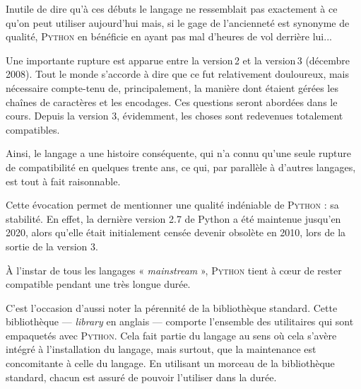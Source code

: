 Inutile de dire qu'à ces débuts le langage ne ressemblait pas exactement à ce qu'on peut utiliser aujourd'hui mais, si le gage de l'ancienneté est synonyme de qualité, \textsc{Python} en bénéficie en ayant pas mal d'heures de vol derrière lui...

Une importante rupture est apparue entre la version\,2 et la version\,3 (décembre 2008). Tout le monde s'accorde à dire que ce fut relativement douloureux, mais nécessaire compte-tenu de, principalement, la manière dont étaient gérées les chaînes de caractères et les encodages. Ces questions seront abordées dans le cours.
Depuis la version 3, évidemment, les choses sont redevenues totalement compatibles. 

Ainsi, le langage a une histoire conséquente, qui n'a connu qu'une seule rupture de compatibilité en quelques trente ans, ce qui, par parallèle à d'autres langages, est tout à fait raisonnable.

Cette évocation permet de mentionner une qualité indéniable de \textsc{Python} : sa stabilité. En effet, la dernière version 2.7 de Python a été maintenue jusqu'en 2020, alors qu'elle était initialement censée devenir obsolète en 2010, lors de la sortie de la version 3.

À l'instar de tous les langages « \textit{mainstream} », \textsc{Python} tient à cœur de rester compatible pendant une très longue durée. 

C'est l'occasion d'aussi noter la pérennité de la bibliothèque standard. Cette bibliothèque --- \textit{library} en anglais --- comporte l'ensemble des utilitaires qui sont empaquetés avec \textsc{Python}. Cela fait partie du langage au sens où cela s'avère intégré à l'installation du langage, mais surtout, que la maintenance est concomitante à celle du langage. En utilisant un morceau de la bibliothèque standard, chacun est assuré de pouvoir l'utiliser dans la durée.


